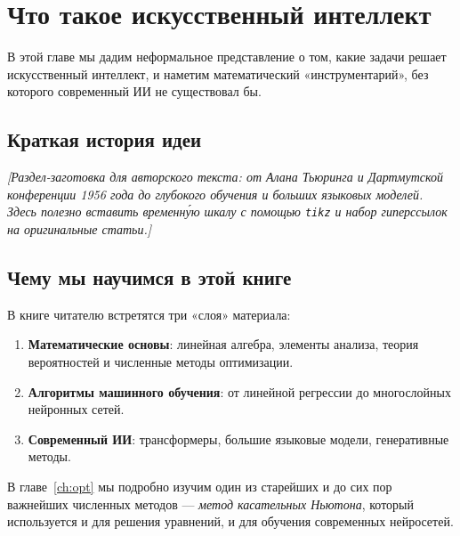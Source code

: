 \chapter{Что такое искусственный интеллект}
\label{ch:intro}

В этой главе мы дадим неформальное представление о том, какие задачи
решает искусственный интеллект, и наметим математический «инструментарий»,
без которого современный ИИ не существовал бы.

\section{Краткая история идеи}

\textit{[Раздел-заготовка для авторского текста: от Алана Тьюринга и
Дартмутской конференции 1956 года до глубокого обучения и больших
языковых моделей. Здесь полезно вставить временну́ю шкалу с помощью
\texttt{tikz} и набор гиперссылок на оригинальные статьи.]}

\section{Чему мы научимся в этой книге}

В книге читателю встретятся три «слоя» материала:
\begin{enumerate}
  \item \textbf{Математические основы}: линейная алгебра, элементы
        анализа, теория вероятностей и численные методы оптимизации.
  \item \textbf{Алгоритмы машинного обучения}: от линейной регрессии
        до многослойных нейронных сетей.
  \item \textbf{Современный ИИ}: трансформеры, большие языковые модели,
        генеративные методы.
\end{enumerate}

В главе~\ref{ch:opt} мы подробно изучим один из старейших и до сих пор
важнейших численных методов — \emph{метод касательных Ньютона}, который
используется и для решения уравнений, и для обучения современных
нейросетей.
